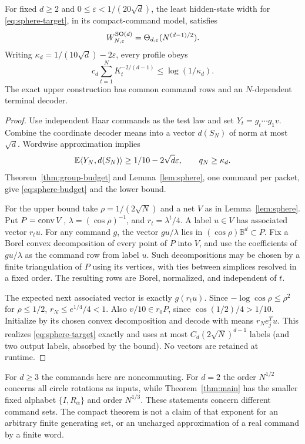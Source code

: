 \begin{theorem}\label{thm:sphere}
For fixed $d\ge2$ and $0\le\varepsilon<1/(20\sqrt d)$, the least
hidden-state width for \eqref{eq:sphere-target}, in its compact-command
model, satisfies
\begin{equation}\label{eq:sphere-width}
             W^{\operatorname{SO}(d)}_{N,\varepsilon}=\Theta_{d,\varepsilon}
                                      (N^{(d-1)/2}).
\end{equation}
Writing $\kappa_d=1/(10\sqrt d)-2\varepsilon$, every profile obeys
\begin{equation}\label{eq:sphere-budget}
       c_d\sum_{t=1}^N K_t^{-2/(d-1)}\le\log(1/\kappa_d).
\end{equation}
The exact upper construction has common command rows and an
$N$-dependent terminal decoder.
\end{theorem}
\begin{proof}
Use independent Haar commands as the test law and set
$Y_t=g_t\cdots g_1v$. Combine the coordinate decoder means into a vector
$d(S_N)$ of norm at most $\sqrt d$. Wordwise approximation implies
\[
 \mathbb E\langle Y_N,d(S_N)\rangle\ge1/10-2\sqrt d\varepsilon,
 \qquad q_N\ge\kappa_d.
\]
Theorem~\ref{thm:group-budget} and Lemma~\ref{lem:sphere}, one command
per packet, give \eqref{eq:sphere-budget} and the lower bound.

For the upper bound take $\rho=1/(2\sqrt N)$ and a net $V$ as in
Lemma~\ref{lem:sphere}. Put $P=\operatorname{conv} V$, $\lambda=(\cos\rho)^{-1}$,
and $r_t=\lambda^t/4$. A label $u\in V$ has associated vector $r_tu$.
For any command $g$, the vector $gu/\lambda$ lies in
$(\cos\rho)\mathbb B^d\subset P$. Fix a Borel convex decomposition
of every point of $P$ into $V$, and use the coefficients of $gu/\lambda$
as the command row from label $u$. Such decompositions may be chosen
by a finite triangulation of $P$ using its vertices, with ties between
simplices resolved in a fixed order. The resulting rows are Borel,
normalized, and independent of $t$.

The expected next associated vector is exactly $g(r_tu)$.
Since $-\log\cos\rho\le\rho^2$ for $\rho\le1/2$,
$r_N\le e^{1/4}/4<1$. Also $v/10\in r_0P$, since
$\cos(1/2)/4>1/10$. Initialize by its chosen convex decomposition and
decode with means $r_Ne_j^Tu$. This realizes \eqref{eq:sphere-target}
exactly and uses at most $C_d(2\sqrt N)^{d-1}$ labels (and two output
labels, absorbed by the bound). No vectors are retained at runtime.
\end{proof}

For $d\ge3$ the commands here are noncommuting. For $d=2$ the order
$N^{1/2}$ concerns all circle rotations as inputs, while Theorem~\ref{thm:main}
has the smaller fixed alphabet $\{I,R_\alpha\}$ and order $N^{1/3}$.
These statements concern different command sets. The compact theorem
is not a claim of that exponent for an arbitrary finite generating set,
or an uncharged approximation of a real command by a finite word.
